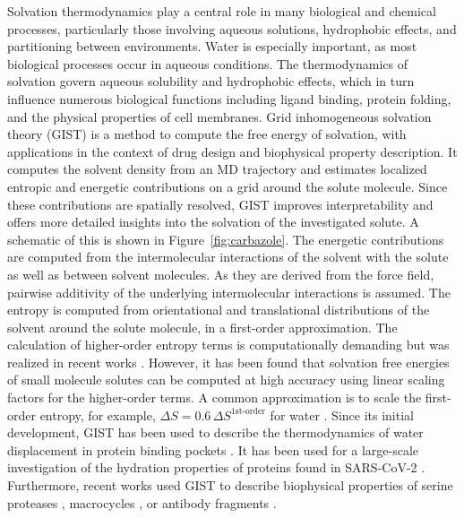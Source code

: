 \documentclass[9pt,tutorial,pubversion]{livecoms}
\begin{document}
Solvation thermodynamics play a central role in many biological and chemical processes, particularly those involving aqueous solutions, hydrophobic effects, and partitioning between environments. Water is especially important, as most biological processes occur in aqueous conditions. 
The thermodynamics of solvation govern aqueous solubility and hydrophobic effects, which in turn influence numerous biological functions including ligand binding, protein folding, and the physical properties of cell membranes.
Grid inhomogeneous solvation theory (GIST) \cite{Nguyen2012} is a method to compute the free energy of solvation, with applications in the context of drug design and biophysical property description.
It computes the solvent density from an MD trajectory and estimates localized entropic and energetic contributions on a grid around the solute molecule.
Since these contributions are spatially resolved, GIST improves interpretability and offers more detailed insights into the solvation of the investigated solute.
A schematic of this is shown in Figure~\ref{fig:carbazole}.
The energetic contributions are computed from the intermolecular interactions of the solvent with the solute as well as between solvent molecules. 
As they are derived from the force field, pairwise additivity of the underlying intermolecular interactions is assumed.
The entropy is computed from orientational and translational distributions of the solvent around the solute molecule, in a first-order approximation. 
The calculation of higher-order entropy terms is computationally demanding but was realized in recent works \cite{Nguyen2016-gist-second-order, Waibl2021-gist-salt}.
However, it has been found that solvation free energies of small molecule solutes can be computed at high accuracy using linear scaling factors for the higher-order terms. 
A common approximation is to scale the first-order entropy, for example, $\Delta S = 0.6\, \Delta S^\text{1st-order}$ for water \cite{Chen2021,Waibl2022-gist-solvents}.
Since its initial development, GIST has been used to describe the thermodynamics of water displacement in protein binding pockets \cite{Nguyen2016-gist-second-order,Ramsey2016,Balius2017-gist-ligand-discovery,Hufner-Wulsdorf2020-gist-drug-design}.
It has been used for a large-scale investigation of the hydration properties of proteins found in SARS-CoV-2 \cite{Olson2020-covid-gist}.
Furthermore, recent works used GIST to describe biophysical properties of serine proteases \cite{Kraml2019-gigist}, macrocycles \cite{Kamenik2020-gist-macrocycles}, or antibody fragments \cite{Waibl2021-gist-antibodies}.
\end{document}
